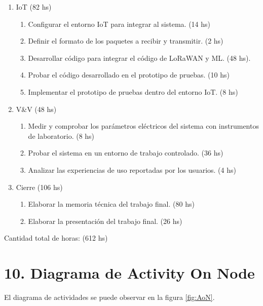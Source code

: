 \documentclass[
11pt, %
]{plan}
\begin{document}
\begin{enumerate}
\item IoT (82 hs)
	\begin{enumerate}
		\item Configurar el entorno IoT para integrar al sistema. (14 hs)
		\item Definir el formato de los paquetes a recibir y transmitir. (2 hs)
		\item Desarrollar código para integrar el código de LoRaWAN y ML. (48 hs).
		\item Probar el código desarrollado en el prototipo de pruebas. (10 hs)
		\item Implementar el prototipo de pruebas dentro del entorno IoT. (8 hs)
	\end{enumerate}
	
\item V\&V (48 hs)
	\begin{enumerate}
		\item Medir y comprobar los parámetros eléctricos del sistema con instrumentos de laboratorio. (8 hs)
		\item Probar el sistema en un entorno de trabajo controlado. (36 hs)
		\item Analizar las experiencias de uso reportadas por los usuarios. (4 hs)
	\end{enumerate}
	
\item Cierre (106 hs)
	\begin{enumerate}
		\item Elaborar la memoria técnica del trabajo final. (80 hs)
		\item Elaborar la presentación del trabajo final. (26 hs)
	\end{enumerate}
\end{enumerate}

Cantidad total de horas: (612 hs)

\section{10. Diagrama de Activity On Node}
\label{sec:AoN}

El diagrama de actividades se puede observar en la figura \ref{fig:AoN}.
\end{document}
